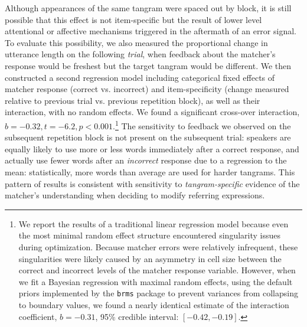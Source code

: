 \documentclass[alpha-refs]{wiley-article}
\begin{document}
Although appearances of the same tangram were spaced out by block, it is still possible that this effect is not item-specific but the result of lower level attentional or affective mechanisms triggered in the aftermath of an error signal.
To evaluate this possibility, we also measured the proportional change in utterance length on the following \emph{trial}, when feedback about the matcher's response would be freshest but the target tangram would be different.
We then constructed a second regression model including categorical fixed effects of matcher response (correct vs. incorrect) and item-specificity (change measured relative to previous trial vs. previous repetition block), as well as their interaction, with no random effects.
We found a significant cross-over interaction, $b = -0.32, t = -6.2, p <0.001$.\footnote{We report the results of a traditional linear regression model because even the most minimal random effect structure encountered singularity issues during optimization. Because matcher errors were relatively infrequent, these singularities were likely caused by an asymmetry in cell size between the correct and incorrect levels of the matcher response variable. However, when we fit a Bayesian regression with maximal random effects, using the default priors implemented by the \texttt{brms} package to prevent variances from collapsing to boundary values, we found a nearly identical estimate of the interaction coefficient, $b = -0.31$, 95\% credible interval: $[-0.42, -0.19]$.}
The sensitivity to feedback we observed on the subsequent repetition block is not present on the subsequent trial: speakers are equally likely to use more or less words immediately after a correct response, and actually use fewer words after an \emph{incorrect} response due to a regression to the mean: statistically, more words than average are used for harder tangrams.
This pattern of results is consistent with sensitivity to \emph{tangram-specific} evidence of the matcher's understanding when deciding to modify referring expressions.


\end{document}
